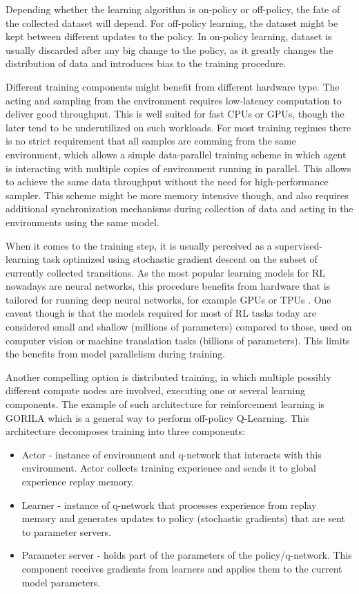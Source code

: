 Depending whether the learning algorithm is on-policy or off-policy, the fate of the collected
dataset will depend. For off-policy learning, the dataset might be kept between different updates
to the policy. In on-policy learning, dataset is usually discarded after any big change to the
policy, as it greatly changes the distribution of data and introduces bias to the training
procedure.

Different training components might benefit from different hardware type. The acting and sampling
from the environment requires low-latency computation to deliver good throughput. This is well
suited for fast CPUs or GPUs, though the later tend to be underutilized on such workloads.
For most training regimes there is no strict requirement that all samples are comming from the
same environment, which allows a simple data-parallel training scheme in which agent is interacting
with multiple copies of environment running in parallel. This allows to achieve the same data
throughput without the need for high-performance sampler. This scheme might be more memory intensive
though, and also requires additional synchronization mechanisms during collection of data
and acting in the environments using the same model.

When it comes to the training step, it is usually perceived as a supervised-learning task
optimized using stochastic gradient descent on the subset of currently collected transitions.
As the most popular learning models for RL nowadays are neural networks, this procedure
benefits from hardware that is tailored for running deep neural networks, for example GPUs
or TPUs \cite{TPU}. One caveat though is that the models required for most of RL tasks today
are considered small and shallow (millions of parameters) compared to those, used on
computer vision or machine translation tasks (billions of parameters). This limits the benefits
from model parallelism during training.

Another compelling option is distributed training, in which multiple possibly different compute
nodes are involved, executing one or several learning components. The example of such architecture
for reinforcement learning is GORILA \cite{GORILA} which is a general way to perform off-policy
Q-Learning. This architecture decomposes training into three components:
\begin{itemize}
    \item Actor - instance of environment and q-network that interacts with this environment.
        Actor collects training experience and sends it to global experience replay memory.

    \item Learner - instance of q-network that processes experience from replay memory and
        generates updates to policy (stochastic gradients) that are sent to parameter servers.

    \item Parameter server - holds part of the parameters of the policy/q-network. This component
        receives gradients from learners and applies them to the current model parameters.
\end{itemize}

